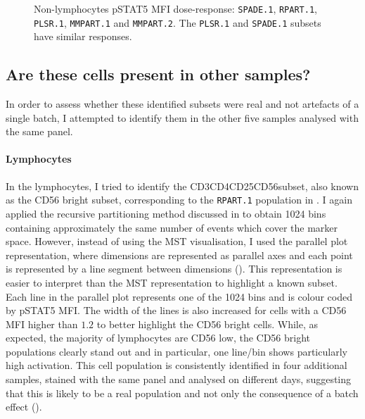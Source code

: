 \begin{figure}
\begin{minipage}{.5\textwidth}
\end{minipage}
\begin{minipage}{.3\textwidth}
{ Non-lymphocytes pSTAT5 MFI dose-response: \texttt{SPADE.1}, \texttt{RPART.1}, \texttt{PLSR.1}, \texttt{MMPART.1} and \texttt{MMPART.2}. }
{
    The \texttt{PLSR.1} and \texttt{SPADE.1} subsets have similar responses.
}
\end{minipage}
\end{figure}



\clearpage

\subsection{Are these cells present in other samples?}

In order to assess whether these identified subsets were real and not artefacts of a single batch, I attempted to identify them in the other five samples analysed with the same panel.

\paragraph{Lymphocytes}

In the lymphocytes, I tried to identify the CD3\negative CD4\negative CD25\negative CD56\positive  subset, also known as the CD56 bright subset, corresponding to the \texttt{RPART.1} population in .
I again applied the recursive partitioning method discussed in  to obtain 1024 bins containing approximately the same number of events which cover the marker space.
However, instead of using the \gls{MST} visualisation, I used the parallel plot representation, where dimensions are represented as parallel axes and each point is represented by a line segment between dimensions ().
This representation is easier to interpret than the \gls{MST} representation to highlight a known subset.
Each line in the parallel plot represents one of the 1024 bins and is colour coded by pSTAT5 MFI.
The width of the lines is also increased for cells with a CD56 MFI higher than $1.2$ to better highlight the CD56 bright cells.
While, as expected, the majority of lymphocytes are CD56 low, the CD56 bright populations clearly stand out and in particular, one line/bin shows particularly high activation.
This cell population is consistently identified in four additional samples, stained with the same panel and analysed on different days, suggesting that this is likely to be a real population and not only the consequence of a batch effect ().

